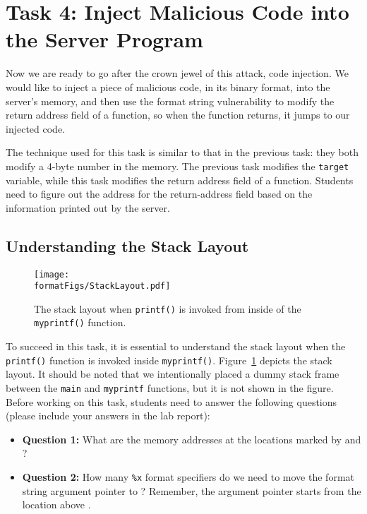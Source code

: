 \section{Task 4: Inject Malicious Code into the Server Program}

Now we are ready to go after the crown jewel of this attack, code injection. 
We would like to inject a piece of malicious code, in its binary format, 
into the server's memory, and then use the format string vulnerability 
to modify the return address field of a function, so when the function returns, 
it jumps to our injected code. 

The technique used for this task is similar to that in the previous task:
they both modify a 4-byte number in the memory. The previous task
modifies the \texttt{target} variable, while this task modifies the return
address field of a function. Students need to figure out the address
for the return-address field based on the information printed out 
by the server. 


\subsection{Understanding the Stack Layout} 

\begin{figure}[htb]
\begin{center}
\texttt{[image: \\formatFigs/StackLayout.pdf]}
\end{center}
\caption{The stack layout when \texttt{printf()} is invoked 
from inside of the \texttt{myprintf()} function.}
\label{format:fig:stacklayout}
\end{figure}

To succeed in this task, it is essential to understand the stack layout when
the \texttt{printf()} function is invoked inside \texttt{myprintf()}. 
Figure~\ref{format:fig:stacklayout} depicts the stack layout. 
It should be noted that we intentionally placed a dummy stack frame between
the \texttt{main} and \texttt{myprintf} functions, but it is not shown in the
figure. Before working on this task, students need to
answer the following questions (please include your answers
in the lab report): 


\begin{itemize}[noitemsep]
\item \textbf{Question 1:}  What are the memory addresses at the locations marked by
 and ?

\item \textbf{Question 2:} How many \texttt{\%x} format specifiers do we 
need to move the format string argument pointer to ? Remember, 
the argument pointer starts from the location above . 
\end{itemize} 



